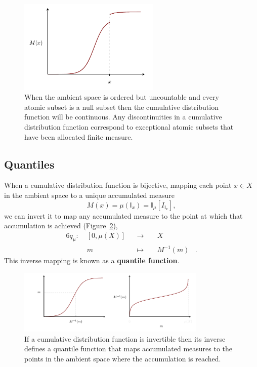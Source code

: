 \documentclass[
  letterpaper,
  DIV=11,
  numbers=noendperiod]{scrartcl}
\begin{document}
\begin{figure}

{\centering \includegraphics[width=0.6\textwidth,height=\textheight]{figures/cdfs/jump/jump.pdf}

}

\caption{\label{fig-cdf-jump}When the ambient space is ordered but
uncountable and every atomic subset is a null subset then the cumulative
distribution function will be continuous. Any discontinuities in a
cumulative distribution function correspond to exceptional atomic
subsets that have been allocated finite measure.}

\end{figure}

\hypertarget{quantiles}{%
\subsection{Quantiles}\label{quantiles}}

When a cumulative distribution function is bijective, mapping each point
\(x \in X\) in the ambient space to a unique accumulated measure \[
M(x) = \mu(\mathsf{I}_{x}) = \mathbb{I}_{\mu}[I_{\mathsf{I}_{x}}],
\] we can invert it to map any accumulated measure to the point at which
that accumulation is achieved (Figure~\ref{fig-quantile-function}),
\begin{alignat*}{6}
q_{\mu} :\; & [0, \mu(X)] & &\rightarrow& \; &X&
\\
& m & &\mapsto& & M^{-1}(m) &.
\end{alignat*} This inverse mapping is known as a \textbf{quantile
function}.

\begin{figure}

{\centering \includegraphics[width=0.8\textwidth,height=\textheight]{figures/quantiles/quantile_function/quantile_function.pdf}

}

\caption{\label{fig-quantile-function}If a cumulative distribution
function is invertible then its inverse defines a quantile function that
maps accumulated measures to the points in the ambient space where the
accumulation is reached.}

\end{figure}
\end{document}
